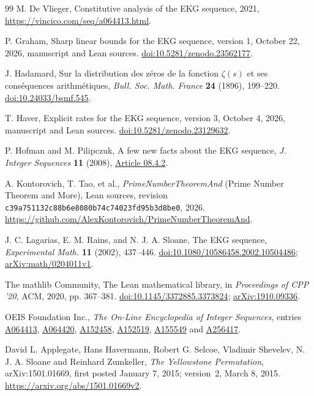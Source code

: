 \documentclass[11pt]{article}
\theoremstyle{remark}
\begin{document}
\begin{thebibliography}{99}
M. De Vlieger, Constitutive analysis of the EKG sequence, 2021,
\url{https://vincico.com/seq/a064413.html}.

P. Graham, Sharp linear bounds for the EKG sequence, version 1,
October 22, 2026, manuscript and Lean sources.
\href{https://doi.org/10.5281/zenodo.23562177}{doi:10.5281/zenodo.23562177}.

J. Hadamard, Sur la distribution des z\'eros de la fonction $\zeta(s)$
et ses cons\'equences arithm\'etiques,
\emph{Bull. Soc. Math. France} \textbf{24} (1896), 199--220.
\href{https://doi.org/10.24033/bsmf.545}{doi:10.24033/bsmf.545}.

T. Haver, Explicit rates for the EKG sequence, version 3,
October 4, 2026, manuscript and Lean sources.
\href{https://doi.org/10.5281/zenodo.23129632}{doi:10.5281/zenodo.23129632}.

P. Hofman and M. Pilipczuk, A few new facts about the EKG sequence,
\emph{J. Integer Sequences} \textbf{11} (2008),
\href{https://cs.uwaterloo.ca/journals/JIS/VOL11/Hofman/hofman1.html}{Article 08.4.2}.

A. Kontorovich, T. Tao, et al.,
\emph{PrimeNumberTheoremAnd} (Prime Number Theorem and More),
Lean sources, revision
\texttt{c39a751132c88b6e8080b74c74023fd95b3d8be0}, 2026.
\url{https://github.com/AlexKontorovich/PrimeNumberTheoremAnd}.

J. C. Lagarias, E. M. Rains, and N. J. A. Sloane,
The EKG sequence, \emph{Experimental Math.} \textbf{11} (2002), 437--446.
\href{https://doi.org/10.1080/10586458.2002.10504486}{doi:10.1080/10586458.2002.10504486};
\href{https://arxiv.org/abs/math/0204011v1}{arXiv:math/0204011v1}.

The mathlib Community, The Lean mathematical library, in
\emph{Proceedings of CPP '20}, ACM, 2020, pp. 367--381.
\href{https://doi.org/10.1145/3372885.3373824}{doi:10.1145/3372885.3373824};
\href{https://arxiv.org/abs/1910.09336}{arXiv:1910.09336}.

OEIS Foundation Inc., \emph{The On-Line Encyclopedia of Integer Sequences},
entries \href{https://oeis.org/A064413}{A064413},
\href{https://oeis.org/A064420}{A064420},
\href{https://oeis.org/A152458}{A152458},
\href{https://oeis.org/A152519}{A152519},
\href{https://oeis.org/A155549}{A155549} and
\href{https://oeis.org/A256417}{A256417}.


David L. Applegate, Hans Havermann, Robert G. Selcoe, Vladimir Shevelev,
N. J. A. Sloane and Reinhard Zumkeller,
\emph{The Yellowstone Permutation},
arXiv:1501.01669, first posted January 7, 2015; version~2, March 8, 2015.
\url{https://arxiv.org/abs/1501.01669v2}.


\end{thebibliography}
\end{document}

